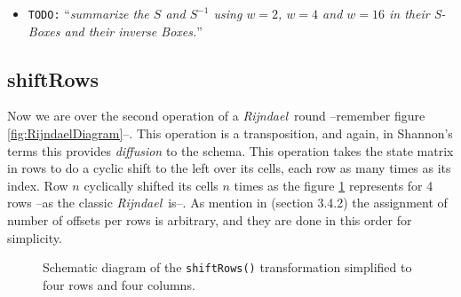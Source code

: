 \documentclass[10pt,a4paper,twoside]{llncs}
\newcommand{\todo}[1]{\texttt{\color{red}TODO:} ``\emph{#1}''}
\newcommand{\fixme}[1]{\texttt{\color{red}FIXME:} ``\emph{#1}''}
\newcommand{\rijndael}{\emph{Rijndael}}
\newcommand{\Fpn}[2]{\ensuremath{\mathbb{F}_{#1^#2}}}
\newcommand{\Fpnm}[2]{\ensuremath{\frac{\Fpn{2}{#1}[#2]}{m(#2)}}}
\begin{document}
\begin{itemize}
\begin{itemize}
\begin{itemize}
   \item \todo{Rule to chose the others, specially odds wordsizes but also bigger than $8$}.
  \end{itemize}
  \item build $g(z)$ in \Fpnm{w}{z}
  \item build $f(z)$ and $f^{-1}(z)$ in \Fpnm{w}{z}
  \begin{itemize}
   \item How to chose the circulant matrix from $b$ of equation \ref{eq:subBytes:affine} used in equation \ref{eq:subBytes:matrix} and the $c$ (and also for the inverse)?
  \end{itemize}
 \end{itemize}
 \item \todo{summarize the $S$ and $S^{-1}$ using $w=2$, $w=4$ and $w=16$ in their \emph{S-Box}es and their inverse Boxes.}
\end{itemize}


\subsection{shiftRows}\label{sec:shiftRows}
Now we are over the second operation of a \rijndael\, round --remember figure \ref{fig:RijndaelDiagram}--. This operation is a transposition, and again, in Shannon's terms this provides \emph{diffusion} to the schema. This operation takes the state matrix in rows to do a cyclic shift to the left over its cells, each row as many times as its index. Row $n$ cyclically shifted its cells $n$ times as the figure \ref{fig:shiftRows} represents for 4 rows --as the classic \rijndael\, is--. As mention in \cite{Daemen:2002:DR:560131} (section 3.4.2) the assignment of number of offsets per rows is arbitrary, and they are done in this order for simplicity.


\begin{figure}[ht]
\begin{center}

\caption{Schematic diagram of the {\tt shiftRows()} transformation simplified to four rows and four columns.}%
\label{fig:shiftRows}
\end{center}
\end{figure}
\end{document}
